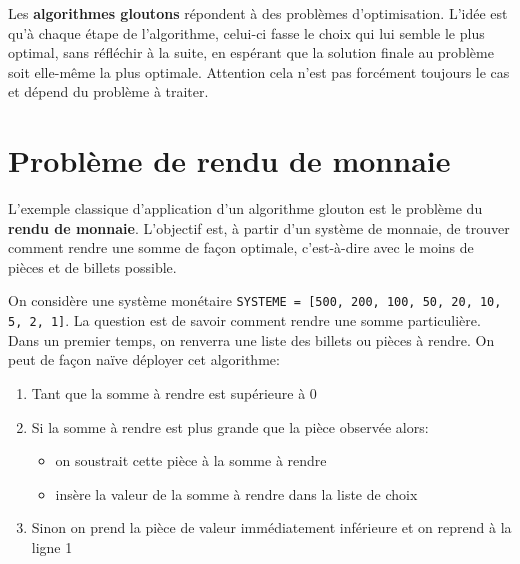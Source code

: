 \def\level{Première}  %
\def\course{NSI}
\def\chaptername{Algorithme Glouton} %
\def\docname{AP09}        %

\pagestyle{cours_FP}
\makeheader{} %

\begin{propriete}{}
Les \textbf{algorithmes gloutons} répondent à des problèmes d'optimisation. L'idée est qu'à chaque étape de l'algorithme, celui-ci fasse le choix qui lui semble le plus optimal, sans réfléchir à la suite, en espérant que la solution finale au problème soit elle-même la plus optimale. Attention cela n'est pas forcément toujours le cas et dépend du problème à traiter.
\end{propriete}

\section{Problème de rendu de monnaie}

L'exemple classique d'application d'un algorithme glouton est le problème du \textbf{rendu de monnaie}. L'objectif est, à partir d'un système de monnaie, de trouver comment rendre une somme de façon optimale, c'est-à-dire avec le moins de pièces et de billets possible.

\medskip

\begin{exemple}[]{}
On considère une système monétaire \verb+SYSTEME = [500, 200, 100, 50, 20, 10, 5, 2, 1]+. La question est de savoir comment rendre une somme particulière. Dans un premier temps, on renverra une liste des billets ou pièces à rendre. On peut de façon naïve déployer cet algorithme:

\begin{enumerate}
	\item Tant que la somme à rendre est supérieure à 0
	\item Si la somme à rendre est plus grande que la pièce observée alors:
	\begin{itemize}
		\item on soustrait cette pièce à la somme à rendre
		\item insère la valeur de la somme à rendre dans la liste de choix
		
	\end{itemize}
	\item Sinon on prend la pièce de valeur immédiatement inférieure et on reprend à la ligne 1
\end{enumerate}
\end{exemple}

